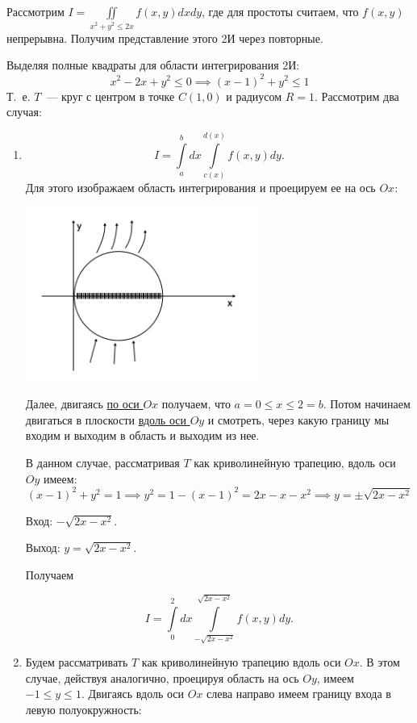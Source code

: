 \documentclass[../../main.tex]{subfiles}
\begin{document}
\begin{exmp}
	Рассмотрим $\displaystyle
	I = \iint\limits_{x^2 + y^2 \leq 2x} 
	f \left(x, y \right) dxdy $, 
	где для простоты считаем, что $ f \left( x, y \right) $ непрерывна. 
	Получим представление этого 2И через повторные.
	
	Выделяя полные квадраты для области интегрирования 2И:
	\[
	x^2 -2x + y^2 \leq 0 \implies (x-1)^2 + y^2 \leq 1
	\]
	Т.~е. $T$~--- круг с центром в точке $C \left( 1, 0 
	\right)$ и радиусом $R = 1$.
	Рассмотрим два случая:
	\begin{enumerate}
		\item   \[ I = \int\limits_a^b dx \int\limits_{c \left( x \right) } ^ 
		 {d \left( x \right) } f \left( x, y \right) dy. \]
		 Для этого изображаем область интегрирования и проецируем ее на ось $ Ox $:
		 
		 \begin{center}
		 	\includegraphics[width=0.6\textwidth]{lec13_circle_case1.png}
		 \end{center}
		 
		 Далее, двигаясь \underline{по оси $ Ox $} получаем, что 
		 $a = 0 \leq x \leq 2 = b$.
		 Потом начинаем двигаться в плоскости 
		 \underline{вдоль оси $ Oy $} и смотреть,
		 через какую границу мы входим и выходим в область и выходим из нее.
		 
		 В данном случае, рассматривая
		 $ T $ как криволинейную трапецию, вдоль оси $ Oy $ имеем:
		 \[ \left( x - 1\right)^2 + y^2 = 1 \implies 
		 y^2 = 1 - \left( x - 1 \right)^2 = 
		 2x - x - x^2 \implies y = \pm \sqrt{ 2x - x^2 } \]
		 
		 Вход: $ -\sqrt{2x - x^2 }$.
		 
		 Выход: $ y = \sqrt{2x - x^2 } $.
		 
		 Получаем
		 
		 \[ I = \int\limits_0^2 dx \int\limits_{-\sqrt{2x - x^2}} ^ 
		 {\sqrt{2x - x^2}} f \left( x, y\right) dy. \]
		\item Будем рассматривать $ T $ как криволинейную трапецию вдоль оси $ Ox $.
		В этом случае, действуя аналогично, проецируя область на ось $ Oy $, имеем 
		$ -1 \leq y \leq 1$. Двигаясь вдоль оси $ Ox $ слева направо 
		имеем границу входа в левую полуокружность:
		

\end{enumerate}
\end{exmp}
\end{document}
